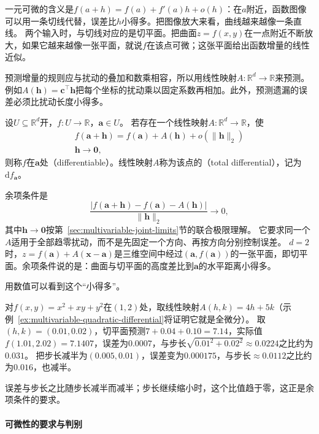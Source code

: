 一元可微的含义是$f(a+h)=f(a)+f'(a)h+o(h)$：在$a$附近，函数图像可以用一条切线代替，误差比$h$小得多。把图像放大来看，曲线越来越像一条直线。
两个输入时，与切线对应的是切平面。把曲面$z=f(x,y)$在一点附近不断放大，如果它越来越像一张平面，就说$f$在该点可微；这张平面给出函数增量的线性近似。

预测增量的规则应与扰动的叠加和数乘相容，所以用线性映射$A:\mathbb R^d\to\mathbb R$来预测。
例如$A(\bm h)=\bm c^\top\bm h$把每个坐标的扰动乘以固定系数再相加。此外，预测遗漏的误差必须比扰动长度小得多。
\begin{definition}[多元标量函数的可微性与全微分]
\label{def:multivariable-total-differential}
设$U\subseteq\mathbb R^d$开，$f:U\to\mathbb R$，$\bm a\in U$。
若存在一个线性映射$A:\mathbb R^d\to\mathbb R$，使
\begin{equation}
\begin{gathered}
f(\bm a+\bm h)=f(\bm a)+A(\bm h)+o(\lVert\bm h\rVert_2)\\
\bm h\to\bm0,
\end{gathered}
\label{eq:analysis-total-differentiability}
\end{equation}
则称$f$在$\bm a$处（differentiable）。线性映射$A$称为该点的（total differential），记为$\mathrm df_{\bm a}$。
\end{definition}
余项条件是
\[
 \frac{|f(\bm a+\bm h)-f(\bm a)-A(\bm h)|}{\lVert\bm h\rVert_2}\longrightarrow0,
\]
其中$\bm h\to\bm 0$按第~\ref{sec:multivariable-joint-limits}节的联合极限理解。
它要求同一个$A$适用于全部趋零扰动，而不是先固定一个方向、再按方向分别控制误差。
$d=2$时，$z=f(\bm a)+A(\bm x-\bm a)$是三维空间中经过$(\bm a,f(\bm a))$的一张平面，即切平面。余项条件说的是：曲面与切平面的高度差比到$\bm a$的水平距离小得多。

用数值可以看到这个“小得多”。
\begin{example}[切平面误差随步长缩小]
\label{ex:multivariable-tangent-plane-error}
对$f(x,y)=x^2+xy+y^2$在$(1,2)$处，取线性映射$A(h,k)=4h+5k$（示例~\ref{ex:multivariable-quadratic-differential}将证明它就是全微分）。
取$(h,k)=(0.01,0.02)$，切平面预测$7+0.04+0.10=7.14$，实际值$f(1.01,2.02)=7.1407$，误差为$0.0007$，与步长$\sqrt{0.01^2+0.02^2}\approx0.0224$之比约为$0.031$。
把步长减半为$(0.005,0.01)$，误差变为$0.000175$，与步长$\approx0.0112$之比约为$0.016$，也减半。
\end{example}

误差与步长之比随步长减半而减半；步长继续缩小时，这个比值趋于零，这正是余项条件的要求。

\paragraph{可微性的要求与判别}
\label{sec:analysis-differentiability-relations}

